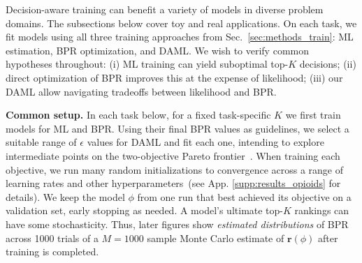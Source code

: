 Decision-aware training can benefit a variety of models in diverse problem domains. 
The subsections below cover toy and real applications. 
On each task, we fit models using all three training approaches from Sec.~\ref{sec:methods_train}: ML estimation, BPR optimization, and DAML.
We wish to verify common hypotheses throughout: (i) ML training can yield suboptimal top-$K$ decisions; (ii) direct optimization of BPR improves this at the expense of likelihood; (iii) our DAML allow navigating tradeoffs between likelihood and BPR.

\textbf{Common setup.}
In each task below, for a fixed task-specific $K$ we first train models for ML and BPR. Using their final BPR values as guidelines, we select a suitable range of $\epsilon$ values for DAML and fit each one, intending to explore intermediate points on the two-objective Pareto frontier~\citep{costa2015ParetoFrontier}.
When training each objective, we run many random initializations to convergence across a range of learning rates and other hyperparameters~(see App. \ref{supp:results_opioids} for details).
We keep the model $\phi$ from one run that best achieved its objective on a validation set, early stopping as needed.
A model's ultimate top-$K$ rankings can have some stochasticity. Thus, later figures show \emph{estimated distributions} of BPR across 1000 trials of a $M{=}1000$ sample Monte Carlo estimate of $\bm{r}(\phi)$ after training is completed.






